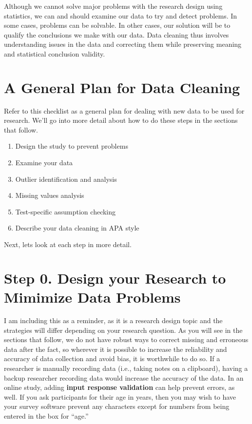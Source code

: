 \documentclass[
]{book}
\begin{document}
Although we cannot solve major problems with the research design using statistics, we can and should examine our data to try and detect problems. In some cases, problems can be solvable. In other cases, our solution will be to qualify the conclusions we make with our data. Data cleaning thus involves understanding issues in the data and correcting them while preserving meaning and statistical conclusion validity.

\hypertarget{a-general-plan-for-data-cleaning}{%
\section{A General Plan for Data Cleaning}\label{a-general-plan-for-data-cleaning}}

Refer to this checklist as a general plan for dealing with new data to be used for research. We'll go into more detail about how to do these steps in the sections that follow.

\begin{enumerate}
\def\labelenumi{\arabic{enumi}.}
\setcounter{enumi}{-1}
\item
  Design the study to prevent problems
\item
  Examine your data
\item
  Outlier identification and analysis
\item
  Missing values analysis
\item
  Test-specific assumption checking
\item
  Describe your data cleaning in APA style
\end{enumerate}

Next, lets look at each step in more detail.

\hypertarget{step-0.-design-your-research-to-mimimize-data-problems}{%
\section{Step 0. Design your Research to Mimimize Data Problems}\label{step-0.-design-your-research-to-mimimize-data-problems}}

I am including this as a reminder, as it is a research design topic and the strategies will differ depending on your research question. As you will see in the sections that follow, we do not have robust ways to correct missing and erroneous data after the fact, so wherever it is possible to increase the reliability and accuracy of data collection and avoid bias, it is worthwhile to do so. If a researcher is manually recording data (i.e., taking notes on a clipboard), having a backup researcher recording data would increase the accuracy of the data. In an online study, adding \textbf{input response validation} can help prevent errors, as well. If you ask participants for their age in years, then you may wish to have your survey software prevent any characters except for numbers from being entered in the box for ``age.''
\end{document}
